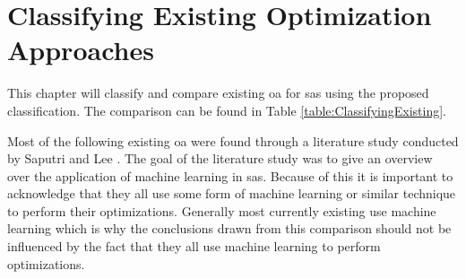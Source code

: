 \section{Classifying Existing Optimization Approaches}
\label{ch:Existing}

This chapter will classify and compare existing \acrshort{oa} for \acrshort{sas} using the proposed classification.
The comparison can be found in Table \ref{table:ClassifyingExisting}.

\noindent Most of the following existing \acrshort{oa} were found through a literature study conducted by Saputri and Lee \cite*{ApplicationOfMachineLearning}.
The goal of the literature study was to give an overview over the application of machine learning in \acrshort{sas}.
Because of this it is important to acknowledge that they all use some form of machine learning or similar technique to perform their optimizations.
Generally most currently existing use machine learning which is why the conclusions drawn from this comparison should not be influenced by the fact
that they all use machine learning to perform optimizations.

